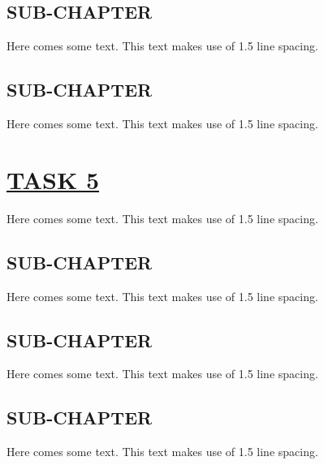 \documentclass[fontsize=11pt]{scrartcl}
\begin{document}
\subsection{SUB-CHAPTER}
Here comes some text. This text makes use of 1.5 line spacing. 
\subsection{SUB-CHAPTER}
Here comes some text. This text makes use of 1.5 line spacing. 
\pagebreak
\section{\uline{TASK 5}}
Here comes some text. This text makes use of 1.5 line spacing. 
\subsection{SUB-CHAPTER}
Here comes some text. This text makes use of 1.5 line spacing. 
\subsection{SUB-CHAPTER}
Here comes some text. This text makes use of 1.5 line spacing. 
\subsection{SUB-CHAPTER}
Here comes some text. This text makes use of 1.5 line spacing. 
\pagebreak
\end{document}
